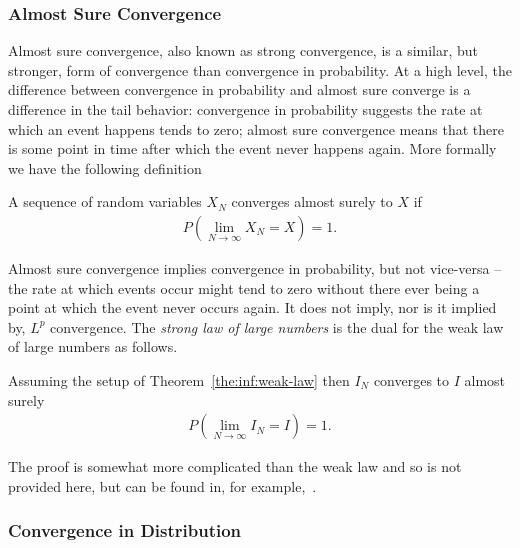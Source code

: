 \subsubsection{Almost Sure Convergence}
\label{sec:inf:mc:conv:as}

Almost sure convergence, also known as strong convergence, is a similar, but stronger, form of convergence than convergence in
probability.  At a high level, the difference between
convergence in probability and almost sure converge is a difference in the tail behavior:
convergence in probability suggests the rate at which an event happens tends to zero; almost
sure convergence means that there is some point in time after which the event never happens
again.  More formally we have the following definition
\begin{definition}
A sequence of random variables $X_N$ converges almost surely to $X$ if
\begin{align}
	P\left(\lim\limits_{N\rightarrow\infty} X_N=X\right)=1.
\end{align}
\end{definition}
\noindent Almost sure convergence implies convergence in probability, but not vice-versa -- the rate
at which events occur might tend to zero without there ever being a point at which the
event never occurs again.  It does not imply, nor is it implied by, $L^p$ convergence.
The \emph{strong law of large numbers} is the dual for the weak law of large numbers as
follows.
\begin{theorem}
	Assuming the setup of Theorem~\ref{the:inf:weak-law} then $I_N$ converges to $I$ almost surely
	\begin{align}
	P\left(\lim\limits_{N\rightarrow\infty} I_N=I\right)=1.
	\end{align}
\end{theorem}
The proof is somewhat more complicated than the weak law and so is not provided here, but can
be found in, for example,~\cite[Theorem 2.4.1]{durrett2010probability}.

\subsubsection{Convergence in Distribution}
\label{sec:inf:mc:conv:dist}

